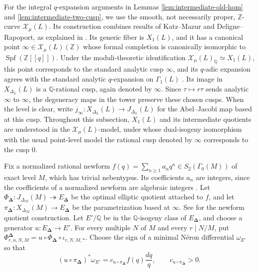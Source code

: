 \documentclass[12pt, letterpaper]{amsart}
\theoremstyle{definition}
\theoremstyle{remark}
\newcommand{\Q}{\mathbb Q}
\newcommand{\Z}{\mathbb Z}
\numberwithin{equation}{section}
\begin{document}
For the integral \(q\)-expansion arguments in Lemmas
\ref{lem:intermediate-old-hom} and \ref{lem:intermediate-two-cusp}, we use the
smooth, not necessarily proper, \(\Z\)-curve \(\mathcal X_\mu(L)\). Its
construction combines results of Katz--Mazur and Deligne--Rapoport, as
explained in \cite[Sections~9.3 and~12.3]{DiamondIm}. Its generic fiber is
\(X_1(L)\), and it has a canonical
point \(\infty\in\mathcal X_\mu(L)(\Z)\) whose formal completion is canonically
isomorphic to \(\operatorname{Spf}(\Z[[q]])\). Under the moduli-theoretic
identification \(\mathcal X_\mu(L)_\Q\simeq X_1(L)\), this point corresponds to
the standard analytic cusp \(\infty\), and its \(q\)-adic expansion agrees with
the standard analytic \(q\)-expansion on \(\Gamma_1(L)\)
\cite[\S6.1.2]{ConradEdixhovenStein}. Its image in
\(X_{\Delta_L}(L)\) is a
\(\Q\)-rational cusp, again denoted by \(\infty\). Since \(\tau\mapsto r\tau\)
sends analytic \(\infty\) to \(\infty\), the degeneracy maps in the tower
preserve these chosen cusps. When the level is clear, write
\(j_\infty:X_{\Delta_L}(L)\to J_{\Delta_L}(L)\) for the Abel--Jacobi map based
at this cusp.
Throughout this subsection, \(X_1(L)\) and its intermediate quotients are
understood in the \(\mathcal X_\mu(L)\)-model, under whose dual-isogeny
isomorphism with the usual point-level model the rational cusp denoted by
\(\infty\) corresponds to the cusp \(0\).

Fix a normalized rational newform
\(f(q)=\sum_{n\ge1}a_nq^n\in S_2(\Gamma_0(M))\) of exact level \(M\), which has
trivial nebentypus. Its coefficients
\(a_n\) are integers, since the coefficients of a normalized newform are
algebraic integers \cite{DiamondShurman}. Let
\(\Phi_{\boldsymbol\Delta}:J_{\Delta_M}(M)\twoheadrightarrow
E_{\boldsymbol\Delta}\) be the optimal elliptic quotient attached to \(f\), and let
\(\pi_{\boldsymbol\Delta}:X_{\Delta_M}(M)\to E_{\boldsymbol\Delta}\) be the
parametrization based at \(\infty\). See
\cite{DiamondShurman} for the newform quotient construction. Let
\(E'/\Q\) be in the \(\Q\)-isogeny class of \(E_{\boldsymbol\Delta}\), and choose
a generator \(u:E_{\boldsymbol\Delta}\to E'\). For every
multiple \(N\) of \(M\) and every \(r\mid N/M\), put
\(\Phi^{\boldsymbol\Delta}_{r,u,N,M}
=u\circ\Phi_{\boldsymbol\Delta}\circ\iota_{r,N,M,*}\).
Choose the sign of a minimal N\'eron differential \(\omega_{E'}\) so that
\begin{equation}\label{eq:intermediate-manin}
        (u\circ\pi_{\boldsymbol\Delta})^*\omega_{E'}
        =
        c_{u\circ\pi_{\boldsymbol\Delta}}f(q)\frac{dq}{q},
        \qquad c_{u\circ\pi_{\boldsymbol\Delta}}>0.
\end{equation}
\end{document}
